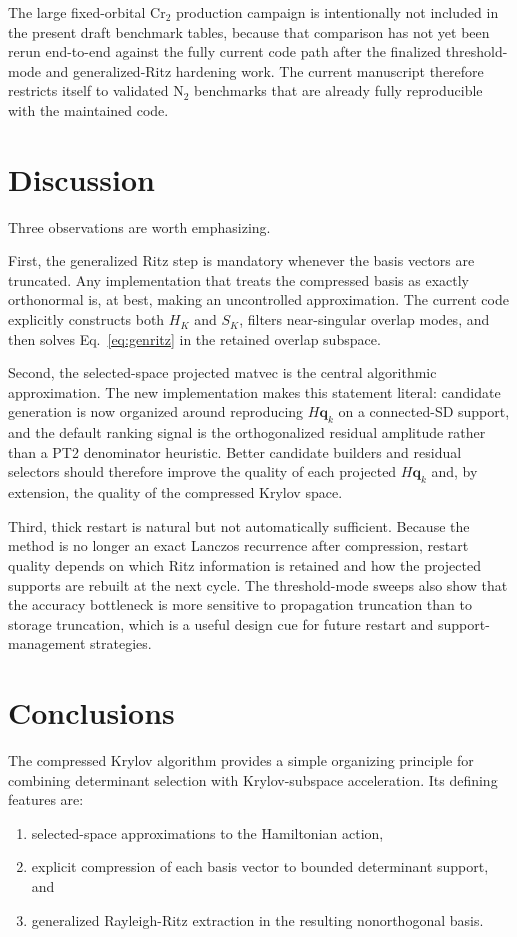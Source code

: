 \documentclass[aip,jcp,preprint,longbibliography]{revtex4-2}
\begin{document}
The large fixed-orbital Cr\(_2\) production campaign is intentionally not included in the present draft benchmark tables, because that comparison has not yet been rerun end-to-end against the fully current code path after the finalized threshold-mode and generalized-Ritz hardening work. The current manuscript therefore restricts itself to validated \(\mathrm{N}_2\) benchmarks that are already fully reproducible with the maintained code.

\section{Discussion}
Three observations are worth emphasizing.

First, the generalized Ritz step is mandatory whenever the basis vectors are truncated. Any implementation that treats the compressed basis as exactly orthonormal is, at best, making an uncontrolled approximation. The current code explicitly constructs both $H_K$ and $S_K$, filters near-singular overlap modes, and then solves Eq.~\eqref{eq:genritz} in the retained overlap subspace.

Second, the selected-space projected matvec is the central algorithmic approximation. The new implementation makes this statement literal: candidate generation is now organized around reproducing $H\bm q_k$ on a connected-SD support, and the default ranking signal is the orthogonalized residual amplitude rather than a PT2 denominator heuristic. Better candidate builders and residual selectors should therefore improve the quality of each projected $H\bm q_k$ and, by extension, the quality of the compressed Krylov space.

Third, thick restart is natural but not automatically sufficient. Because the method is no longer an exact Lanczos recurrence after compression, restart quality depends on which Ritz information is retained and how the projected supports are rebuilt at the next cycle. The threshold-mode sweeps also show that the accuracy bottleneck is more sensitive to propagation truncation than to storage truncation, which is a useful design cue for future restart and support-management strategies.

\section{Conclusions}
The compressed Krylov algorithm provides a simple organizing principle for combining determinant selection with Krylov-subspace acceleration. Its defining features are:
\begin{enumerate}
  \item selected-space approximations to the Hamiltonian action,
  \item explicit compression of each basis vector to bounded determinant support, and
  \item generalized Rayleigh-Ritz extraction in the resulting nonorthogonal basis.
\end{enumerate}
\end{document}
